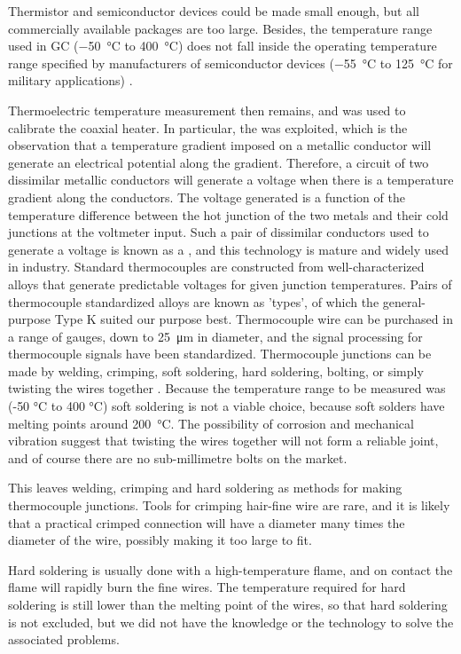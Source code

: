 Thermistor and semiconductor devices could be made small enough, but all
commercially available packages are too large. Besides, the temperature range
used in GC (\SI{-50}{\celsius} to \SI{400}{\celsius}) does not fall inside the
operating temperature range specified by manufacturers of semiconductor devices
(\SI{-55}{\celsius} to \SI{125}{\celsius} for military applications)
\autocite{nullD1996}.

Thermoelectric temperature measurement then remains, and was used to calibrate
the coaxial heater. In particular, the  was exploited,
which is the observation that a temperature gradient imposed on a metallic
conductor will generate an electrical potential along the gradient. Therefore, a
circuit of two dissimilar metallic conductors will generate a voltage when there
is a temperature gradient along the conductors. The voltage generated is a
function of the temperature difference between the hot junction of the two
metals and their cold junctions at the voltmeter input. Such a pair of
dissimilar conductors used to generate a voltage is known as a
, and this technology is mature and widely used in
industry. Standard thermocouples are constructed from well-characterized alloys
that generate predictable voltages for given junction temperatures. Pairs of
thermocouple standardized alloys are known as 'types', of which the
general-purpose Type K suited our purpose best. Thermocouple wire can be
purchased in a range of gauges, down to \SI{25}{\micro\metre} in diameter, and the
signal processing for thermocouple signals have been standardized. Thermocouple
junctions can be made by welding, crimping, soft soldering, hard soldering,
bolting, or simply twisting the wires together \autocite{McGee1988}. Because the
temperature range to be measured was ({-}50 \si{\celsius} to 400 \si{\celsius})
soft soldering is not a viable choice, because soft solders have melting points
around \SI{200}{\celsius}. The possibility of corrosion and mechanical vibration
suggest that twisting the wires together will not form a reliable joint, and of
course there are no sub-millimetre bolts on the market.

This leaves welding, crimping and hard soldering as methods for making
thermocouple junctions. Tools for crimping hair-fine wire are rare, and it is
likely that a practical crimped connection will have a diameter many times the
diameter of the wire, possibly making it too large to fit. 

Hard soldering is usually done with a high-temperature flame, and on contact the
flame will rapidly burn the fine wires. The temperature required for hard
soldering is still lower than the melting point of the wires, so that hard
soldering is not excluded, but we did not have the knowledge or the technology
to solve the associated problems.


